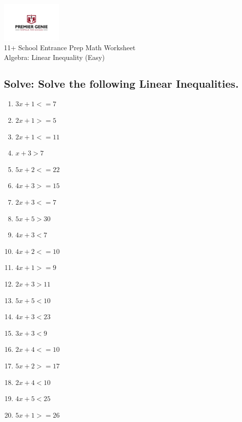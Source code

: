 \documentclass{article}
\begin{document}
\begin{center}
\includegraphics[width=3cm]{PREMGENIEJPG.jpg}\\
{\Large 11+ School Entrance Prep Math Worksheet}\\
{\Medium Algebra: Linear Inequality (Easy)}\\

\end{center}

\subsection*{Solve: Solve the following Linear Inequalities.}

\begin{enumerate}
\item $\displaystyle 3 x + 1<=7 $ \ 
\item $\displaystyle 2 x + 1>=5 $ \ 
\item $\displaystyle 2 x + 1<=11 $ \ 
\item $\displaystyle x + 3>7 $ \ 
\item $\displaystyle 5 x + 2<=22 $ \ 
\item $\displaystyle 4 x + 3>=15 $ \ 
\item $\displaystyle 2 x + 3<=7 $ \ 
\item $\displaystyle 5 x + 5>30 $ \ 
\item $\displaystyle 4 x + 3<7 $ \ 
\item $\displaystyle 4 x + 2<=10 $ \ 
\item $\displaystyle 4 x + 1>=9 $ \ 
\item $\displaystyle 2 x + 3>11 $ \ 
\item $\displaystyle 5 x + 5<10 $ \ 
\item $\displaystyle 4 x + 3<23 $ \ 
\item $\displaystyle 3 x + 3<9 $ \ 
\item $\displaystyle 2 x + 4<=10 $ \ 
\item $\displaystyle 5 x + 2>=17 $ \ 
\item $\displaystyle 2 x + 4<10 $ \ 
\item $\displaystyle 4 x + 5<25 $ \ 
\item $\displaystyle 5 x + 1>=26 $ \ 


\end{enumerate}
\end{document}
